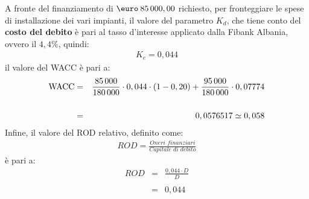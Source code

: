 	A fronte del finanziamento di $\mbox{\euro} \: 85\thinspace 000,00$ richiesto, per fronteggiare le spese di installazione dei vari impianti, il valore del parametro $K_d$, che tiene conto del \textbf{costo del debito} è pari al tasso d'interesse applicato dalla \ac{Fibank Albania}, ovvero il $4,4 \%$, quindi:  
	\begin{equation}
	\label{eq:kd_fibank}
	\begin{split}
		K_e = 0,044
	\end{split}
	\end{equation} 	
	 il valore del \ac{WACC} è pari a:
	\begin{eqnarray}
	\label{eq:wacc_tax_value}
		\mbox{WACC} & = & \frac{85\thinspace 000}{180\thinspace 000} \cdot 0,044 \cdot ( 1 - 0,20 ) + \frac{95\thinspace 000}{180\thinspace 000} \cdot 0,07774 \nonumber \\
		\nonumber \\
			 & = & 0,0576517 \simeq 0,058
	\end{eqnarray}
	Infine, il valore del \ac{ROD} relativo, definito come:
	\begin{equation}
	\label{eq:rod_definizione}
	\begin{split}
		ROD = \frac{\textit{Oneri finanziari}}{\textit{Capitale di debito}} 
	\end{split}
	\end{equation}
	è pari a:
	\begin{eqnarray}
	\label{eq:rod_calcolo}	
		ROD & = & \frac{0,044 \cdot D}{D} \nonumber \\
										   \nonumber \\
			& = & 0,044	
	\end{eqnarray}